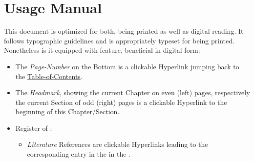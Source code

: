 %
\section{Usage Manual}

This document is optimized for both, being printed as well as digital reading.
It follows typographic guidelines and is appropriately typeset for being printed.
Nonetheless is it equipped with feature, beneficial in digital form:

\begin{itemize}
\item
    The \textit{Page-Number} on the Bottom is a clickable Hyperlink jumping back to the \hyperref[chap:ToC]{Table-of-Contents}.
\item
    The \textit{Headmark}, showing the current Chapter on even (left) pages, respectively the current Section of odd (right) pages is a clickable Hyperlink to the beginning of this Chapter/Section.
\item
    Register of \hyperref[chap:literature]{}:
    \hyperref[chap:literature]{}
    \begin{itemize}
    \item
        \textit{Literature} References are clickable Hyperlinks leading to the corresponding entry in the \hyperref[chap:literature]{} in the .

\end{itemize}
\end{itemize}
